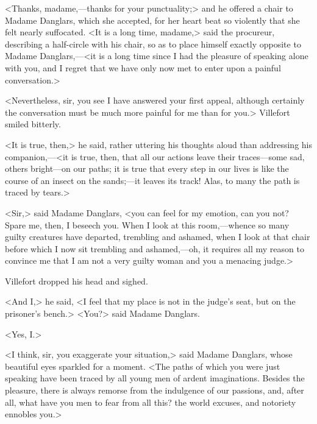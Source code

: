  <Thanks, madame,—thanks for your punctuality;> and he offered a chair to Madame Danglars, which she accepted, for her heart beat so violently that she felt nearly suffocated.  <It is a long time, madame,> said the procureur, describing a half-circle with his chair, so as to place himself exactly opposite to Madame Danglars,—<it is a long time since I had the pleasure of speaking alone with you, and I regret that we have only now met to enter upon a painful conversation.> 

 <Nevertheless, sir, you see I have answered your first appeal, although certainly the conversation must be much more painful for me than for you.> Villefort smiled bitterly. 

 <It is true, then,> he said, rather uttering his thoughts aloud than addressing his companion,—<it is true, then, that all our actions leave their traces—some sad, others bright—on our paths; it is true that every step in our lives is like the course of an insect on the sands;—it leaves its track! Alas, to many the path is traced by tears.> 

 <Sir,> said Madame Danglars, <you can feel for my emotion, can you not? Spare me, then, I beseech you. When I look at this room,—whence so many guilty creatures have departed, trembling and ashamed, when I look at that chair before which I now sit trembling and ashamed,—oh, it requires all my reason to convince me that I am not a very guilty woman and you a menacing judge.> 

 Villefort dropped his head and sighed. 

 <And I,> he said, <I feel that my place is not in the judge's seat, but on the prisoner's bench.>  <You?> said Madame Danglars. 

 <Yes, I.> 

 <I think, sir, you exaggerate your situation,> said Madame Danglars, whose beautiful eyes sparkled for a moment. <The paths of which you were just speaking have been traced by all young men of ardent imaginations. Besides the pleasure, there is always remorse from the indulgence of our passions, and, after all, what have you men to fear from all this? the world excuses, and notoriety ennobles you.> 


